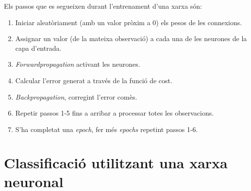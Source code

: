 \documentclass[12pt]{article}
\begin{document}
\pagebreak
Els passos que es segueixen durant l'entrenament d'una xarxa són:
\begin{enumerate}
	\item Iniciar aleatòriament (amb un valor pròxim a 0) els pesos de les connexions.
	\item Assignar un valor (de la mateixa observació) a cada una de les neurones de la capa d'entrada.
	\item \textit{Forwardpropagation} activant les neurones.
	\item Calcular l'error generat a través de la funció de cost.
	\item \textit{Backpropagation}, corregint l'error comès.
	\item Repetir passos 1-5 fins a arribar a processar totes les observacions.
	\item S'ha completat una \textit{epoch}, fer més \textit{epochs} repetint passos 1-6.
\end{enumerate}

\clearpage
\section{Classificació utilitzant una xarxa neuronal}
\end{document}

